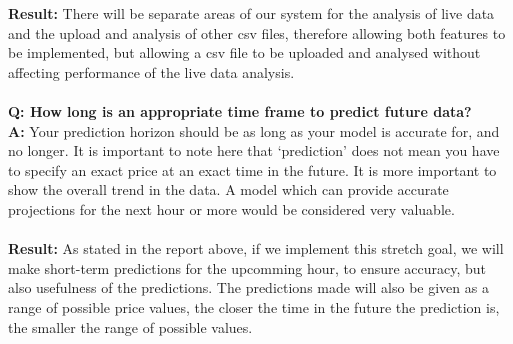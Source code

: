 \documentclass[11pt, oneside, a4paper]{article}
\begin{document}
\textbf{Result:} There will be separate areas of our system for the analysis of live data and the upload and analysis of other csv files,
therefore allowing both features to be implemented, but allowing a csv file to be uploaded and analysed without affecting performance of the live
data analysis. \\\\
\textbf{Q: How long is an appropriate time frame to predict future data?}\\
\textbf{A:} Your prediction horizon should be as long as your model is accurate for, and no longer. It is important to note here that `prediction'
does not mean you have to specify an exact price at an exact time in the future. It is more important to show the overall trend in the data.
A model which can provide accurate projections for the next hour or more would be considered very valuable.\\\\
\textbf{Result:} As stated in the report above, if we implement this stretch goal, we will make short-term predictions for the upcomming hour, to
ensure accuracy, but also usefulness of the predictions. The predictions made will also be given as a range of possible price values, the closer
the time in the future the prediction is, the smaller the range of possible values.
\end{document}
